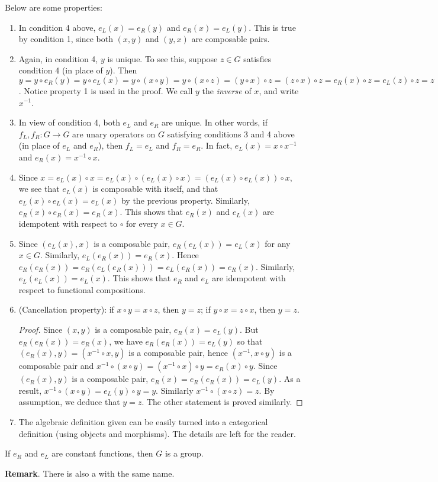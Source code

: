 \documentclass[12pt]{article}
\begin{document}
Below are some properties:
\begin{enumerate}
\item In condition 4 above, $e_L(x)=e_R(y)$ and $e_R(x)=e_L(y)$.  This is true by condition 1, since both $(x,y)$ and $(y,x)$ are composable pairs.
\item Again, in condition 4, $y$ is unique.  To see this, suppose $z\in G$ satisfies condition 4 (in place of $y$).  Then $y= y\circ e_R(y)= y\circ e_L(x) = y\circ (x\circ y)=y\circ (x\circ z)=(y\circ x)\circ z= (z\circ x)\circ z=e_R(x)\circ z = e_L(z)\circ z = z$.  Notice property 1 is used in the proof.  We call $y$ the \emph{inverse} of $x$, and write $x^{-1}$.
\item In view of condition 4, both $e_L$ and $e_R$ are unique.  In other words, if $f_L,f_R:G\to G$ are unary operators on $G$ satisfying conditions 3 and 4 above (in place of $e_L$ and $e_R$), then $f_L=e_L$ and $f_R=e_R$.  In fact, $e_L(x)=x\circ x^{-1}$ and $e_R(x)=x^{-1}\circ x$.
\item Since $x=e_L(x)\circ x=e_L(x)\circ (e_L(x)\circ x)=(e_L(x)\circ e_L(x))\circ x$, we see that $e_L(x)$ is composable with itself, and that $e_L(x)\circ e_L(x)=e_L(x)$ by the previous property.  Similarly, $e_R(x)\circ e_R(x)=e_R(x)$.  This shows that $e_R(x)$ and $e_L(x)$ are idempotent with respect to $\circ$ for every $x\in G$.
\item Since $(e_L(x),x)$ is a composable pair, $e_R(e_L(x))=e_L(x)$ for any $x\in G$.  Similarly, $e_L(e_R(x))=e_R(x)$.  Hence $e_R(e_R(x))= e_R(e_L(e_R(x)))=e_L(e_R(x))=e_R(x)$.  Similarly, $e_L(e_L(x))=e_L(x)$.  This shows that $e_R$ and $e_L$ are idempotent with respect to functional compositions.
\item (Cancellation property): if $x\circ y= x\circ z$, then $y=z$; if $y\circ x=z\circ x$, then $y=z$.
\begin{proof}
Since $(x,y)$ is a composable pair, $e_R(x)=e_L(y)$.  But $e_R(e_R(x))=e_R(x)$, we have $e_R(e_R(x))=e_L(y)$ so that $(e_R(x),y)=(x^{-1}\circ x,y)$ is a composable pair, hence $(x^{-1},x\circ y)$ is a composable pair and $x^{-1}\circ (x\circ y)=(x^{-1}\circ x)\circ y=e_R(x)\circ y$.  Since $(e_R(x),y)$ is a composable pair, $e_R(x)=e_R(e_R(x))=e_L(y)$.  As a result, $x^{-1}\circ (x\circ y)=e_L(y)\circ y =y$.  Similarly $x^{-1}\circ (x\circ z)=z$.  By assumption, we deduce that $y=z$.  The other statement is proved similarly.
\end{proof}
\item The algebraic definition given can be easily turned into a categorical definition (using objects and morphisms).  The details are left for the reader.
\end{enumerate}

If $e_R$ and $e_L$ are constant functions, then $G$ is a group.

\textbf{Remark}.  There is also a  with the same name.
\end{document}
